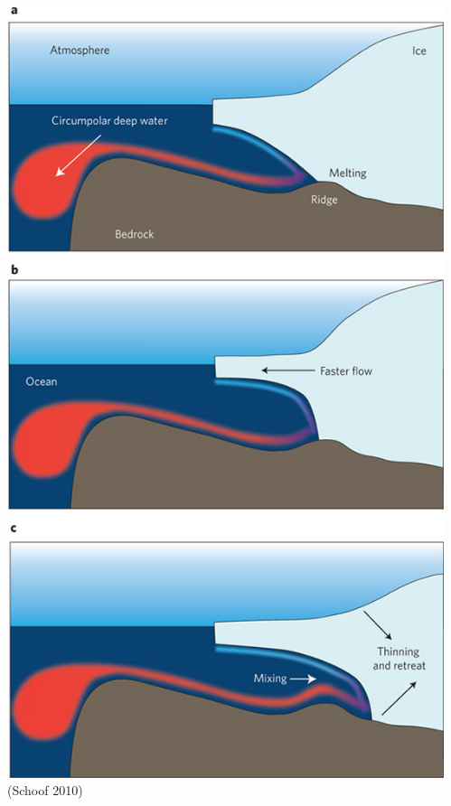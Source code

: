\begin{frame}
  \begin{columns}
    \begin{column}{0.45\textwidth}
      \vspace{-1em}
      \includegraphics[width=\textwidth]{figures/GroundingLine/SchoofNature2010} \\
\footnotesize{(Schoof 2010)}
    \end{column}
    \begin{column}{0.55\textwidth}

\end{column}
\end{columns}
\end{frame}
